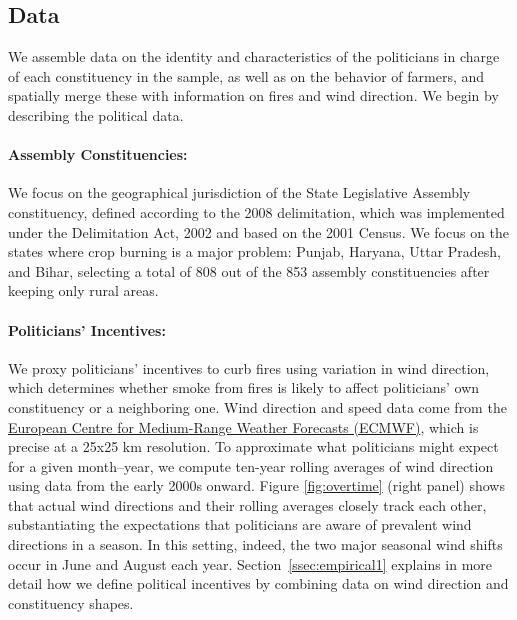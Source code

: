 \documentclass[12pt]{article}
\begin{document}
\subsection{Data\label{ssec:data1}}

We assemble data on the identity and characteristics of the politicians in charge of each constituency in the sample, as well as on the behavior of farmers, and spatially merge these with information on fires and wind direction. We begin by describing the political data.

\paragraph{Assembly Constituencies:} We focus on the geographical jurisdiction of the State Legislative Assembly constituency, defined according to the 2008 delimitation, which was implemented under the Delimitation Act, 2002 \citep{delimitation_act_2002} and
based on the 2001 Census. We focus on the states where crop burning is a major problem: Punjab, Haryana, Uttar Pradesh, and Bihar, selecting a total of 808  out of the  853 assembly constituencies after keeping only rural areas. 






\paragraph{Politicians' Incentives:} We proxy politicians' incentives to curb fires using variation in wind direction, which determines whether smoke from fires is likely to affect politicians' own constituency or a neighboring one. Wind direction and speed data come from the \href{https://www.ecmwf.int/en/forecasts/datasets}{European Centre for Medium-Range Weather Forecasts (ECMWF)}, which is precise at a 25x25 km resolution. To approximate what politicians might expect for a given month–year, we compute ten-year rolling averages of wind direction using data from the early 2000s onward. Figure \ref{fig:overtime} (right panel) shows that actual wind directions and their rolling averages closely track each other, substantiating the expectations that politicians are aware of prevalent wind directions in a season. In this setting, indeed, the two major seasonal wind shifts occur in June and August each year. Section~\ref{ssec:empirical1} explains in more detail how we define political incentives by combining data on wind direction and constituency shapes.
\end{document}
